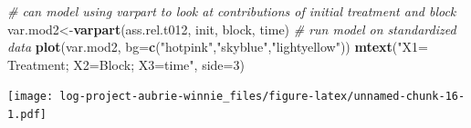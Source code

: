 \documentclass[
]{article}
\newenvironment{Shaded}{\begin{snugshade}}{\end{snugshade}}
\newcommand{\AttributeTok}[1]{\textcolor[rgb]{0.13,0.29,0.53}{#1}}
\newcommand{\CommentTok}[1]{\textcolor[rgb]{0.56,0.35,0.01}{\textit{#1}}}
\newcommand{\DecValTok}[1]{\textcolor[rgb]{0.00,0.00,0.81}{#1}}
\newcommand{\FunctionTok}[1]{\textcolor[rgb]{0.13,0.29,0.53}{\textbf{#1}}}
\newcommand{\NormalTok}[1]{#1}
\newcommand{\OtherTok}[1]{\textcolor[rgb]{0.56,0.35,0.01}{#1}}
\newcommand{\StringTok}[1]{\textcolor[rgb]{0.31,0.60,0.02}{#1}}
\begin{document}
\begin{Shaded}
\begin{Highlighting}[]
\CommentTok{\# can model using varpart to look at contributions of initial treatment and block}
\NormalTok{var.mod2}\OtherTok{\textless{}{-}}\FunctionTok{varpart}\NormalTok{(ass.rel.t012, init, block, time) }\CommentTok{\# run model on standardized data}
\FunctionTok{plot}\NormalTok{(var.mod2, }\AttributeTok{bg=}\FunctionTok{c}\NormalTok{(}\StringTok{"hotpink"}\NormalTok{,}\StringTok{"skyblue"}\NormalTok{,}\StringTok{"lightyellow"}\NormalTok{))}
\FunctionTok{mtext}\NormalTok{(}\StringTok{"X1= Treatment; X2=Block; X3=time"}\NormalTok{, }\AttributeTok{side=}\DecValTok{3}\NormalTok{)}
\end{Highlighting}
\end{Shaded}

\texttt{[image: log-project-aubrie-winnie\_files/figure-latex/unnamed-chunk-16-1.pdf]}
\end{document}
